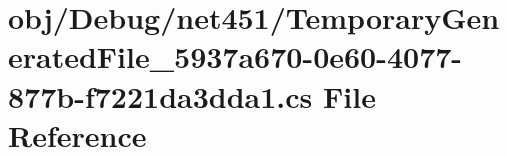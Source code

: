 \hypertarget{_debug_2net451_2_temporary_generated_file__5937a670-0e60-4077-877b-f7221da3dda1_8cs}{}\section{obj/\+Debug/net451/\+Temporary\+Generated\+File\+\_\+5937a670-\/0e60-\/4077-\/877b-\/f7221da3dda1.cs File Reference}
\label{_debug_2net451_2_temporary_generated_file__5937a670-0e60-4077-877b-f7221da3dda1_8cs}
